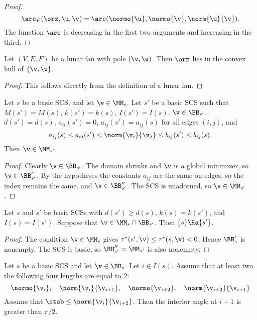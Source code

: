 \begin{proof}
\[
\arc_V(\orz,\u,\v) = \arc(\normo{\u},\normo{\v},\norm{\u}{\v}).
\]
The function $\arc$ is decreasing in the first two arguments and increasing in the third.
\end{proof}

\begin{lemma}[]
Let $(V,E,F)$ be a lunar fan with pole $(\v,\w)$.  Then $\orz$ lies in the convex hull of $\{\v,\w\}$.
\end{lemma}

\begin{proof} This follows directly from the definition of a lunar fan.
\end{proof}

\begin{lemma}[]\label{lemma:transfer-prelim} 
Let $s$ be a basic SCS, and let $\v\in \MM_s$.  Let $s'$ be a basic SCS such that
$M(s')=M(s)$, $k(s')=k(s)$, $I(s')=I(s)$,  $\v\in \BB_{s'}$, $d(s')=d(s)$, $a_{ii}(s')=0$,
$a_{ij}(s') = a_{ij}(s)$ for all edges $(i,j)$, and
\[
a_{ij} (s) \le a_{ij}(s') \le \norm{\v_i}{\v_j} \le b_{ij}(s') \le b_{ij}(s).
\]
Then  $\v\in \MM_{s'}$.
\end{lemma}

\begin{proof} 
Clearly $\v\in \BB_{s'}$.  
The domain shrinks and $\v$ is a global minimizer, so $\v\in \BB'_{s'}$.
By the hypotheses the constants $a_{ij}$ are the same on edges, so the index remains the same, and $\v\in \BB''_{s'}$.
The SCS is unadorned, so $\v\in \MM_{s'}$.
\end{proof}

\begin{lemma}[]
Let $s$ and $s'$ be basic SCSs with $d(s') \ge d(s)$,  $k(s) = k(s')$, and $I(s) = I(s')$.
Suppose that $\v\in \MM_s \cap \BB_{s'}$.
Then $\{s\}\Ra \{s'\}$.
\end{lemma}

\begin{proof}
The condition $\v\in\MM_s$ gives $\tau^*(s',\v)\le \tau^*(s,\v)<0$.  Hence $\BB'_s$ is nonempty.
The SCS is basic, so $\BB''_{s'} = \MM_{s'}$ is also nonempty.
\end{proof}

\begin{lemma}\label{lemma:scs-obtuse}
Let $s$ be a basic SCS and let $\v\in \BB_s$. Let $i\in I(s)$.
Assume that at least two the following four lengths are equal to $2$:
\[
\normo{\v_i},\quad \norm{\v_i}{\v_{i+1}},\quad
\normo{\v_{i+2}},\quad \norm{\v_{i+2}}{\v_{i+1}}
\]
Assume that $\stab\le \norm{\v_i}{\v_{i+2}}$.  Then the interior angle at $i+1$ is
greater than $\pi/2$.
\end{lemma}

